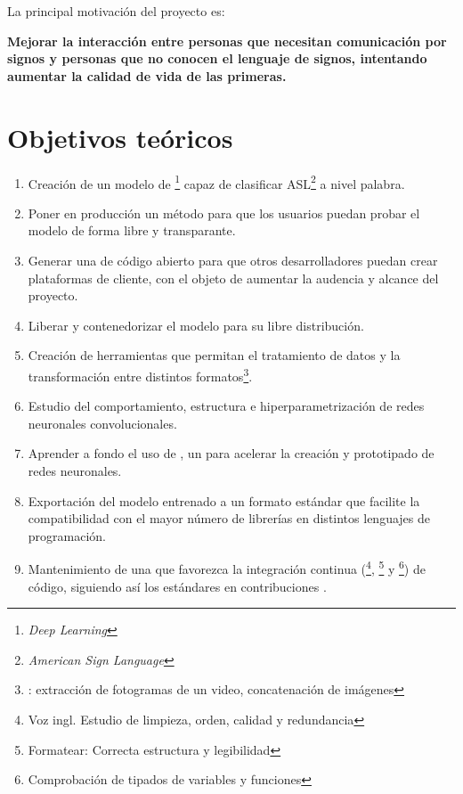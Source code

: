 
La principal motivación del proyecto es:

\textbf{
  Mejorar la interacción entre personas que necesitan comunicación por signos y personas que no conocen el lenguaje de signos, intentando aumentar la calidad de vida de las primeras.
}


\section{Objetivos teóricos}

\begin{enumerate}
  \item Creación de un modelo de \footnote{\textit{Deep Learning}} capaz de clasificar ASL\footnote{\textit{American Sign Language}} a nivel palabra.
  \item Poner en producción un método para que los usuarios puedan probar el modelo de forma libre y transparante.
  \item Generar una  de código abierto para que otros desarrolladores puedan crear plataformas de cliente, con el objeto de aumentar la audencia y alcance del proyecto.
  \item Liberar y contenedorizar el modelo para su libre distribución.
  \item Creación de herramientas que permitan el tratamiento de datos y la transformación entre distintos formatos\footnote{\pe: extracción de fotogramas de un video, concatenación de imágenes}.
  \item Estudio del comportamiento, estructura e hiperparametrización de redes neuronales convolucionales.
  \item Aprender a fondo el uso de \cite{PYTORCH}, un  para acelerar la creación y prototipado de redes neuronales.
  \item Exportación del modelo entrenado a un formato estándar que facilite la compatibilidad con el mayor número de librerías en distintos lenguajes de programación.
  \item Mantenimiento de una  que favorezca la integración continua (\footnote{Voz ingl. Estudio de limpieza, orden, calidad y redundancia}, \footnote{Formatear: Correcta estructura y legibilidad} y \footnote{Comprobación de tipados de variables y funciones}) de código, siguiendo así los estándares en contribuciones .
\end{enumerate}


